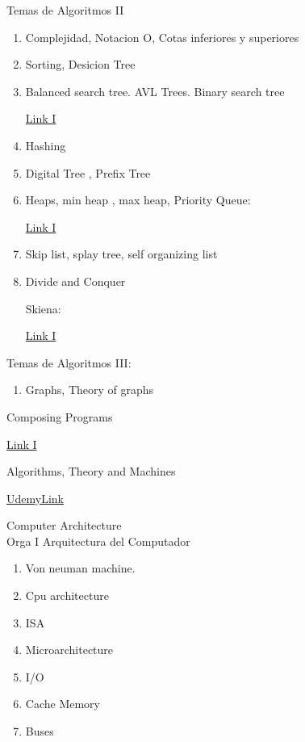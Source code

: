 \documentclass{article} %
\begin{document}
Temas de Algoritmos II
\\

\begin{enumerate}
	\item Complejidad, Notacion O, Cotas inferiores y superiores

	\item Sorting, Desicion Tree

	\item Balanced search tree. AVL Trees. Binary search tree
		
		\href{https://www.youtube.com/watch?v=1QSYxIKXXP4}{Link I}
	\item Hashing

	\item Digital Tree , Prefix Tree

	\item Heaps, min heap , max heap, Priority Queue:

		\href{https://www.youtube.com/watch?v=wptevk0bshY}{Link I}

	\item Skip list, splay tree, self organizing list 

	\item Divide and Conquer

		Skiena:

		\href{https://www3.cs.stonybrook.edu/~skiena/373/videos/}{Link I}
\end{enumerate}

Temas de Algoritmos III:
	\begin{enumerate}
		\item Graphs, Theory of graphs
	\end{enumerate}


Composing Programs 

		\href{https://composingprograms.com/}{Link I}


Algorithms, Theory and Machines

		\href{https://www.coursera.org/learn/cs-algorithms-theory-machines?ranMID=40328&ranEAID=PtFMiHYfEVk&ranSiteID=PtFMiHYfEVk-N0HmN.LJcvptt5HuvGaPwA&siteID=PtFMiHYfEVk-N0HmN.LJcvptt5HuvGaPwA&utm_content=10&utm_medium=partners&utm_source=linkshare&utm_campaign=PtFMiHYfEVk#syllabus}{UdemyLink}

\newpage
Computer Architecture
\\


Orga I Arquitectura del Computador
	\begin{enumerate}

		\item Von neuman machine.
		\item	Cpu architecture
		\item ISA
		\item Microarchitecture
		\item I/O
		\item Cache Memory
		\item Buses
	\end{enumerate}
\end{document}
